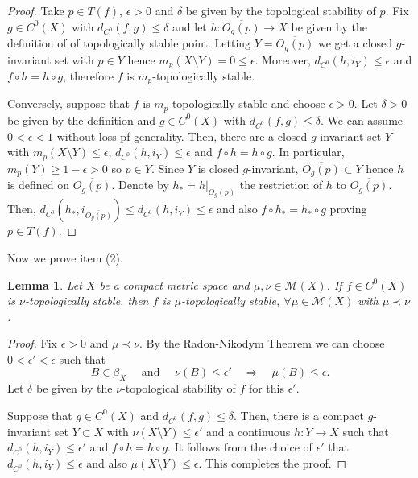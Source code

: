 \documentclass[11pt,letterpaper]{amsart}
\theoremstyle{plain}
\newtheorem{lemma}{Lemma}
\begin{document}
\begin{proof}
Take $p\in T(f)$, $\epsilon>0$ and $\delta$ be given by the topological stability of $p$.
Fix $g\in C^0(X)$ with $d_{C^0}(f,g)\leq\delta$ and let $h:\overline{O_g(p)}\to X$
be given by the definition of of topologically stable point.
Letting $Y=\overline{O_g(p)}$ we get a closed $g$-invariant set
with $p\in Y$ hence  $m_p(X\setminus Y)=0\leq\epsilon$.
Moreover, $d_{C^0}(h,i_Y)\leq \epsilon$ and $f\circ h=h\circ g$,
therefore $f$ is $m_p$-topologically stable.

Conversely, suppose that
$f$ is $m_p$-topologically stable and choose $\epsilon>0$.
Let $\delta>0$ be given by the definition and $g\in C^0(X)$ with $d_{C^0}(f,g)\leq\delta$.
We can assume $0<\epsilon<1$ without loss pf generality.
Then, there are a closed $g$-invariant set $Y$ with $m_p(X\setminus Y)\leq\epsilon$,
$d_{C^0}(h,i_Y)\leq\epsilon$ and $f\circ h=h\circ g$.
In particular, $m_p(Y)\geq 1-\epsilon>0$ so $p\in Y$.
Since $Y$ is closed $g$-invariant,
$\overline{O_g(p)}\subset Y$ hence $h$ is defined on $\overline{O_g(p)}$.
Denote by $h_*=h|_{\overline{O_g(p)}}$ the restriction of $h$ to $\overline{O_g(p)}$.
Then, $d_{C^0}(h_*,i_{\overline{O_g(p)}})\leq d_{C^0}(h,i_Y)\leq\epsilon$
and also $f\circ h_*=h_*\circ g$ proving $p\in T(f)$.
\end{proof}

Now we prove item (2).

\begin{lemma}
\label{convidado}
Let $X$ be a compact metric space and $\mu,\nu\in \mathcal{M}(X)$.
If $f\in C^0(X)$ is $\nu$-topologically stable, then $f$ is $\mu$-topologically stable, $\forall \mu\in\mathcal{M}(X)$ with $\mu\prec\nu$.
\end{lemma}

\begin{proof}
Fix $\epsilon>0$ and $\mu\prec\nu$.
By the Radon-Nikodym Theorem we can choose $0<\epsilon'< \epsilon$ such that
$$
B\in \beta_X\quad\mbox{ and }\quad \nu(B)\leq\epsilon'\quad\Longrightarrow\quad \mu(B)\leq\epsilon.
$$
Let $\delta$ be given by the $\nu$-topological stability of $f$ for this $\epsilon'$.

Suppose that $g\in C^0(X)$ and $d_{C^0}(f,g)\leq\delta.$
Then, there is a compact $g$-invariant set $Y\subset X$
with $\nu(X\setminus Y)\leq\epsilon'$ and
a continuous $h:Y\to X$ such that
$d_{C^0}(h,i_Y)\leq\epsilon'$ and $f\circ h=h\circ g$.
It follows from the choice of $\epsilon'$ that
$d_{C^0}(h,i_Y)\leq\epsilon$ and also $\mu(X\setminus Y)\leq\epsilon$. This completes the proof.
\end{proof}
\end{document}
